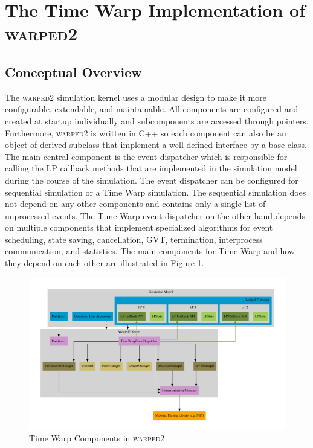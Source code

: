 \documentclass[11pt]{book}
\begin{document}
\section{The Time Warp Implementation of \textsc{warped2}}

\subsection{Conceptual Overview}

The \textsc{warped2} simulation kernel uses a modular design to make it more configurable,
extendable, and maintainable.  All components are configured and created at startup individually
and subcomponents are accessed through pointers.  Furthermore, \textsc{warped2} is written in
C++ so each component can also be an object of derived subclass that implement a well-defined
interface by a base class.  The main central component is the event dispatcher which is responsible
for calling the LP callback methods that are implemented in the simulation model during
the course of the simulation.  The event dispatcher can be configured for sequential simulation
or a Time Warp simulation.  The sequential simulation does not depend on any other components and
contains only a single list of unprocessed events.  The Time Warp event dispatcher on the other
hand depends on multiple components that implement specialized algorithms for event scheduling,
state saving, cancellation, GVT, termination, interprocess communication, and statistics.  The
main components for Time Warp and how they depend on each other are illustrated in Figure
\ref{warped2_architecture}.

\begin{figure}
    \centering
    \includegraphics[width=\textwidth,quiet]{figs/graphviz/warped2_overview.pdf}
    \caption{Time Warp Components in \textsc{warped2}}\label{warped2_architecture}
\end{figure}
\end{document}
